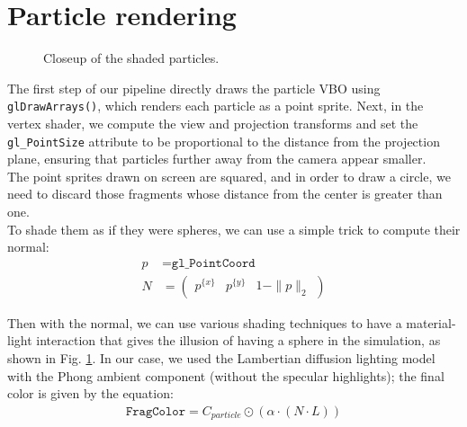 \section{Particle rendering}

\begin{figure}[ht!]
    \centering
    \caption{Closeup of the shaded particles.}\label{fig:particleShading}
\end{figure}

\noindent
The first step of our pipeline directly draws the particle VBO using \texttt{glDrawArrays()}, which renders each particle as a point sprite. Next, in the vertex shader, we compute the view and projection transforms and set the \texttt{gl\_PointSize} attribute to be proportional to the distance from the projection plane, ensuring that particles further away from the camera appear smaller.\\
The point sprites drawn on screen are squared, and in order to draw a circle, we need to discard those fragments whose distance from the center is greater than one.\\
To shade them as if they were spheres, we can use a simple trick to compute their normal:
\begin{align}
    p &= \texttt{gl\_PointCoord}\nonumber \\
    N &= \begin{pmatrix} p^{\{x\}} & p^{\{y\}} & 1-\|p\|_2\end{pmatrix}\label{eq:sphereEq}
\end{align}

\noindent
Then with the normal, we can use various shading techniques to have a material-light interaction that gives the illusion of having a sphere in the simulation, as shown in Fig. \ref{fig:particleShading}. In our case, we used the Lambertian diffusion lighting model with the Phong ambient component (without the specular highlights); the final color is given by the equation:
\begin{align}
    \texttt{FragColor} = C_{particle} \odot (\alpha \cdot(N\cdot L)) 
\end{align}



